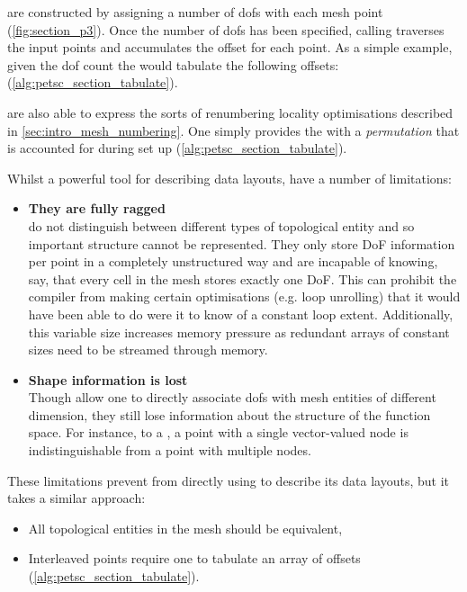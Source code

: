 \documentclass[thesis]{subfiles}
\begin{document}
 are constructed by assigning a number of \glspl{dof} with each mesh point (\cref{fig:section_p3}).
Once the number of \glspl{dof} has been specified, calling  traverses the input points and accumulates the offset for each point.
As a simple example, given the \gls{dof} count \ccode{[1, 0, 3, 2, 0, 1]} the  would tabulate the following offsets: \ccode{[0, 1, 1, 4, 6, 6]} (\cref{alg:petsc_section_tabulate}).

 are also able to express the sorts of renumbering locality optimisations described in \cref{sec:intro_mesh_numbering}.
One simply provides the  with a \textit{permutation} that is accounted for during set up (\cref{alg:petsc_section_tabulate}).

Whilst a powerful tool for describing data layouts,  have a number of limitations:

\begin{itemize}
  \item
    \textbf{They are fully ragged}\\
     do not distinguish between different types of topological entity and so important structure cannot be represented.
    They only store DoF information per point in a completely unstructured way and are incapable of knowing, say, that every cell in the mesh stores exactly one DoF.
    This can prohibit the compiler from making certain optimisations (e.g. loop unrolling) that it would have been able to do were it to know of a constant loop extent.
    Additionally, this variable size increases memory pressure as redundant arrays of constant sizes need to be streamed through memory.

  \item
    \textbf{Shape information is lost}\\
    Though  allow one to directly associate \glspl{dof} with mesh entities of different dimension, they still lose information about the structure of the function space.
    For instance, to a , a point with a single vector-valued node is indistinguishable from a point with multiple nodes.
\end{itemize}

These limitations prevent  from directly using  to describe its data layouts, but it takes a similar approach:

\begin{itemize}
  \item All topological entities in the mesh should be equivalent,
  \item Interleaved points require one to tabulate an array of offsets (\cref{alg:petsc_section_tabulate}).
\end{itemize}
\end{document}
